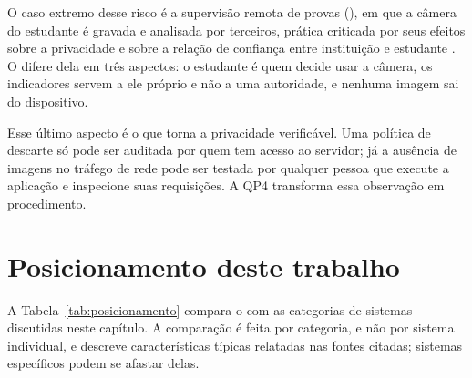 O caso extremo desse risco é a supervisão remota de provas (), em que a câmera do estudante é gravada e analisada por terceiros, prática criticada por seus efeitos sobre a privacidade e sobre a relação de confiança entre instituição e estudante . O \ferramenta difere dela em três aspectos: o estudante é quem decide usar a câmera, os indicadores servem a ele próprio e não a uma autoridade, e nenhuma imagem sai do dispositivo.

Esse último aspecto é o que torna a privacidade verificável. Uma política de descarte só pode ser auditada por quem tem acesso ao servidor; já a ausência de imagens no tráfego de rede pode ser testada por qualquer pessoa que execute a aplicação e inspecione suas requisições. A QP4 transforma essa observação em procedimento.

\section{\label{sec:posicionamento}Posicionamento deste trabalho}

A Tabela~\ref{tab:posicionamento} compara o \ferramenta com as categorias de sistemas discutidas neste capítulo. A comparação é feita por categoria, e não por sistema individual, e descreve características típicas relatadas nas fontes citadas; sistemas específicos podem se afastar delas.

